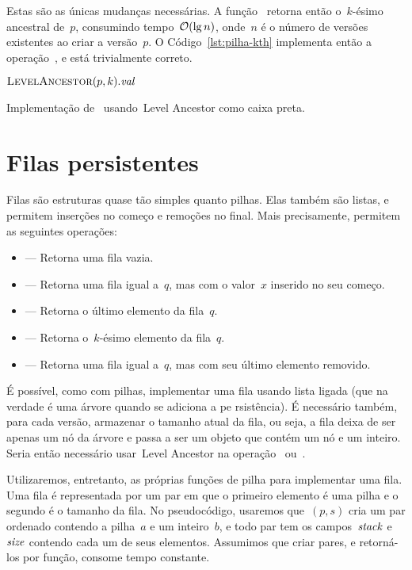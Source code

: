 \documentclass[main.tex]{subfiles}
\begin{document}
Estas são as únicas mudanças necessárias. A função~ retorna então o~\mbox{$k$-ésimo} ancestral de~$p$, consumindo tempo~$\mathcal{O}(\lg n)$, onde~$n$ é o número de versões existentes ao criar a versão~$p$.
O Código~\ref{lst:pilha-kth} implementa então a operação~, e está trivialmente correto.

\begin{algorithm}
\begin{algorithmic}[1]
    \State \Return $\Call{LevelAncestor}{p, k}.\V{val}$
\EndFunction
\end{algorithmic}
\caption{Implementação de~ usando~Level Ancestor como caixa preta.} \label{lst:pilha-kth}
\end{algorithm}

\section{Filas persistentes}

Filas são estruturas quase tão simples quanto pilhas. Elas também são listas, e permitem inserções no começo e remoções no final. Mais precisamente, permitem as seguintes operações:

\begin{itemize}
	\item {} --- Retorna uma fila vazia.
	\item {} --- Retorna uma fila igual a~$q$, mas com o valor~$x$ inserido no seu começo.
	\item {} --- Retorna o último elemento da fila~$q$.
	\item {} --- Retorna o~\mbox{$k$-ésimo} elemento da fila~$q$.
	\item {} --- Retorna uma fila igual a~$q$, mas com seu último elemento removido.
\end{itemize}

É possível, como com pilhas, implementar uma fila usando lista ligada (que na verdade é uma árvore quando se adiciona a pe
rsistência). É necessário também, para cada versão, armazenar o tamanho atual da fila, ou seja, a fila deixa de ser apenas um nó da árvore e passa a ser um objeto que contém um nó e um inteiro. Seria então necessário usar~Level Ancestor na operação~ ou~.

Utilizaremos, entretanto, as próprias funções de pilha para implementar uma fila. Uma fila é representada por um par em que o primeiro elemento é uma pilha e o segundo é o tamanho da fila. No pseudocódigo, usaremos que~$(p,s)$ cria um par ordenado contendo a pilha~$a$ e um inteiro~$b$, e todo par tem os campos~$\mathit{stack}$ e~$\mathit{size}$ contendo cada um de seus elementos.
Assumimos que criar pares, e retorná-los por função, consome tempo constante.
\end{document}
